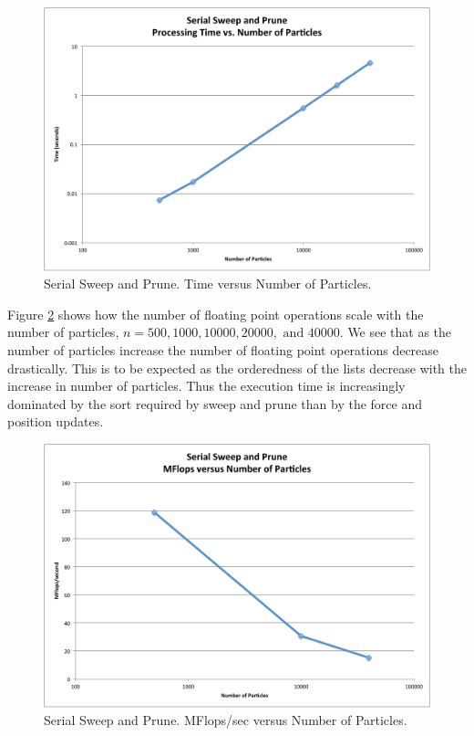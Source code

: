 \documentclass[11pt]{article} %
\begin{document}
\begin{figure}
\begin{centering}
\includegraphics[width=0.5\paperwidth]{figures/serial_t_v_n}
\par\end{centering}

\caption{Serial Sweep and Prune. Time versus Number of Particles.}
\label{plot:serial_t_v_n}

\end{figure}


Figure \ref{plot:serial_flops_v_n} shows how the number of floating
point operations scale with the number of particles, $n=500,1000,10000,20000,\text{ and }40000$.
We see that as the number of particles increase the number of floating
point operations decrease drastically. This is to be expected as the
orderedness of the lists decrease with the increase in number of particles.
Thus the execution time is increasingly dominated by the sort required
by sweep and prune than by the force and position updates.

\begin{figure}
\begin{centering}
\includegraphics[width=0.5\paperwidth]{figures/serial_flops_v_n}
\par\end{centering}

\caption{Serial Sweep and Prune. MFlops/sec versus Number of Particles.}
\label{plot:serial_flops_v_n}
\end{figure}
\end{document}
